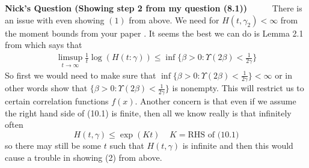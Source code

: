 \documentclass[a4paper,11pt]{article}
\theoremstyle{plain}
\theoremstyle{definition}
\newcounter{NQ}
\newenvironment{NickQuestion}[1][] %
  {\refstepcounter{NQ}
  \begin{mdframed}[backgroundcolor=lightgray]\textbf{Nick's Question \theNQ \: #1~~}~~~\noindent}%
  {\end{mdframed}}
\numberwithin{NQ}{section}
\numberwithin{LQ}{section}
\numberwithin{ZQ}{section}
\begin{document}
\begin{NickQuestion}[(Showing step 2 from my question (8.1))]
There is an issue with even showing $(1)$ from above. We need for $H(t,\gamma_2)<\infty$ from the moment bounds from your paper \cite{CH16Comparison}. It seems the best we can do is Lemma 2.1 from \cite{CH16Comparison} which says that \begin{align} \limsup_{t\to\infty}\frac{1}{t}\log(H(t:\gamma))\le \inf\{\beta >0 : \Upsilon(2\beta)<\frac{1}{2\gamma}\} \end{align} So first we would need to make sure that $\inf\{\beta >0 : \Upsilon(2\beta)<\frac{1}{2\gamma}\}<\infty$ or in other words show that $\{\beta >0 : \Upsilon(2\beta)<\frac{1}{2\gamma}\}$ is nonempty. This will restrict us to certain correlation functions $f(x)$. Another concern is that even if we assume the right hand side of (10.1) is finite, then all we know really is that infinitely often $$ H(t,\gamma) \le \exp(Kt) \;\;\;\; K=\text{RHS of (10.1)}$$ so there may still be some $t$ such that $H(t,\gamma)$ is infinite and then this would cause a trouble in showing (2) from above. 
\end{NickQuestion}
\end{document}
